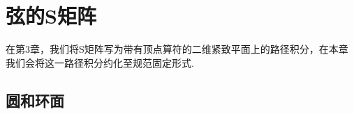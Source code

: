 \setcounter{section}{0}%
\setcounter{chapter}{4}

\chapter{弦的S矩阵}
在第3章，我们将S矩阵写为带有顶点算符的二维紧致平面上的路径积分，在本章我们会将这一路径积分约化至规范固定形式.
\section{圆和环面}

